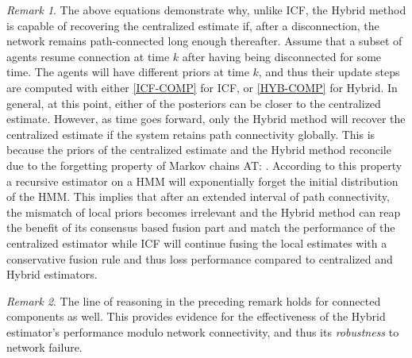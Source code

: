 \documentclass[conference]{IEEEtran}
\theoremstyle{remark}
\newtheorem{remark}{Remark}
\newcommand{\axx}[1]{{\color{blue} AT: #1  \ }}  %
\begin{document}
\begin{remark}
	The above equations demonstrate why, unlike ICF, the Hybrid method is capable 
	of 
	recovering the centralized estimate if, after a disconnection, the network 
	remains path-connected long enough thereafter. Assume that a subset of agents 
	resume connection at time $k$ after having being disconnected for some time. 
	The agents will have different priors at 
	time $k$, and thus their update steps are computed with either \eqref{ICF-COMP} 
	for ICF, or 
	\eqref{HYB-COMP} for Hybrid. 
	In general, at this point, either of  the 
	posteriors can be closer to the centralized estimate. 
	However, as time 
	goes forward, only the Hybrid method 
	will recover the centralized estimate if the system retains path 
	connectivity globally.
	This is 
	because the priors of 
	the centralized estimate and the 
	Hybrid method reconcile due to the forgetting property of Markov chains 
	\axx{ \cite{anderson1997forgetting}. According to this property a recursive 
	estimator on a HMM will exponentially forget the initial distribution of 
	the HMM. This implies that after an extended interval of path connectivity, 
	the mismatch of local priors becomes irrelevant and the Hybrid method can 
	reap the benefit of its consensus based fusion part and match the 
	performance of the centralized estimator while ICF will continue fusing the 
	local estimates with a conservative fusion rule and thus loss performance 
	compared to centralized and Hybrid estimators.}

\end{remark}

\begin{remark}
	The line of reasoning in the preceding remark holds for connected components as 
	well. This provides evidence 
	for the effectiveness of the Hybrid estimator's performance modulo network 
	connectivity, and thus its \textit{robustness} to network failure.
\end{remark}


\normalfont
\end{document}
